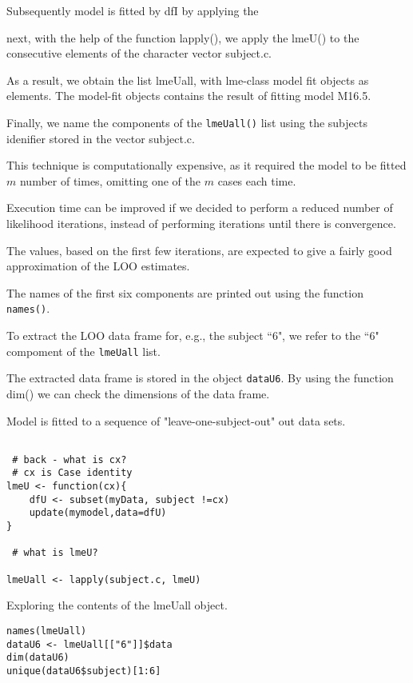 \documentclass[a4paper,12pt]{article}
\begin{document}
Subsequently model is fitted by dfI by applying the 


next, with the help of the function lapply(), we apply the lmeU() to the consecutive elements of the character vector subject.c.

As a result, we obtain the list lmeUall, with lme-class model fit objects as elements. The model-fit objects contains the result of fitting model
M16.5.

Finally, we name the components of the \texttt{lmeUall()} list using the subjects idenifier stored in the vector subject.c.

This technique is computationally expensive, as it required the model to be fitted $m$ number of times, omitting one of the $m$ cases each time.

Execution time can be improved if we decided to perform a reduced number of likelihood iterations, instead of performing iterations until there is convergence.

The values, based on the first few iterations, are expected to give a fairly good approximation of the LOO estimates.


The names of the first six components are printed out using the function \texttt{names()}.

To extract the LOO data frame for, e.g., the subject ``6", we refer to the ``6" compoment of the
\texttt{lmeUall} list.

The extracted data frame is stored in the object \texttt{dataU6}. By using the function dim() we can check the dimensions of the data frame.



Model is fitted to a sequence of "leave-one-subject-out" out data sets.


\begin{framed}
\begin{verbatim}

 # back - what is cx?
 # cx is Case identity
lmeU <- function(cx){
	dfU <- subset(myData, subject !=cx)
	update(mymodel,data=dfU)
}

 # what is lmeU?

lmeUall <- lapply(subject.c, lmeU)
\end{verbatim}
\end{framed}
Exploring the contents of the lmeUall object.
\begin{framed}
\begin{verbatim}
names(lmeUall)
dataU6 <- lmeUall[["6"]]$data
dim(dataU6)
unique(dataU6$subject)[1:6]
\end{verbatim}
\end{framed}
\end{document}
